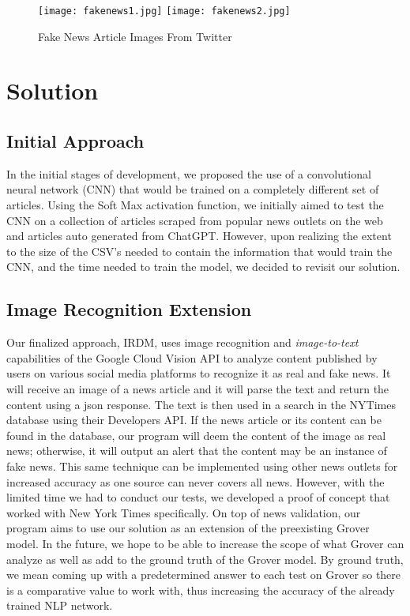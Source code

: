 \documentclass[conference]{IEEEtran}
\begin{document}
\begin{figure}
\centering
    \texttt{[image: fakenews1.jpg]}
    \texttt{[image: fakenews2.jpg]}
    \caption{Fake News Article Images From Twitter}
\label{fig:fakenews1}
\end{figure}

\section{Solution}

\subsection{Initial Approach}

In the initial stages of development, we proposed the use of a convolutional neural network (CNN) that would be trained on a completely different set of articles. Using the Soft Max activation function, we initially aimed to test the CNN on a collection of articles scraped from popular news outlets on the web and articles auto generated from ChatGPT. However, upon realizing the extent to the size of the CSV's needed to contain the information that would train the CNN, and the time needed to train the model, we decided to revisit our solution. 


\subsection{Image Recognition Extension}

Our finalized approach, IRDM, uses image recognition and \emph{image-to-text} capabilities of the Google Cloud Vision API to analyze content published by users on various social media platforms to recognize it as real and fake news. It will receive an image of a news article and it will parse the text and return the content using a json response. The text is then used in a search in the NYTimes database using their Developers API. If the news article or its content can be found in the database, our program will deem the content of the image as real news; otherwise, it will output an alert that the content may be an instance of fake news. This same technique can be implemented using other news outlets for increased accuracy as one source can never covers all news. However, with the limited time we had to conduct our tests, we developed a proof of concept that worked with New York Times specifically. On top of news validation, our program aims to use our solution as an extension of the preexisting Grover model. In the future, we hope to be able to increase the scope of what Grover can analyze as well as add to the ground truth of the Grover model. By ground truth, we mean coming up with a predetermined answer to each test on Grover so there is a comparative value to work with, thus increasing the accuracy of the already trained NLP network. 
\end{document}
